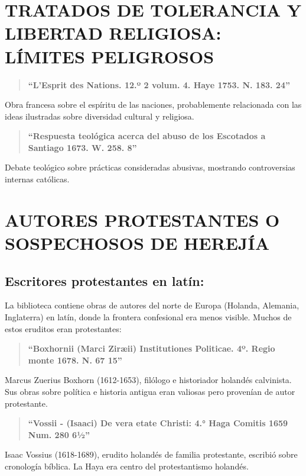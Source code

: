 \documentclass[12pt,a4paper]{article}
\begin{document}
\section{TRATADOS DE TOLERANCIA Y LIBERTAD RELIGIOSA: LÍMITES PELIGROSOS}

\begin{quote}
\textbf{``L'Esprit des Nations. 12.º 2 volum. 4. Haye 1753. N. 183. 24''}
\end{quote}

Obra francesa sobre el espíritu de las naciones, probablemente relacionada con las ideas ilustradas sobre diversidad cultural y religiosa.

\begin{quote}
\textbf{``Respuesta teológica acerca del abuso de los Escotados a Santiago 1673. W. 258. 8''}
\end{quote}

Debate teológico sobre prácticas consideradas abusivas, mostrando controversias internas católicas.

\section{AUTORES PROTESTANTES O SOSPECHOSOS DE HEREJÍA}

\subsection*{Escritores protestantes en latín:}

La biblioteca contiene obras de autores del norte de Europa (Holanda, Alemania, Inglaterra) en latín, donde la frontera confesional era menos visible. Muchos de estos eruditos eran protestantes:

\begin{quote}
\textbf{``Boxhornii (Marci Ziræii) Institutiones Politicae. 4º. Regio monte 1678. N. 67 15''}
\end{quote}

Marcus Zuerius Boxhorn (1612-1653), filólogo e historiador holandés calvinista. Sus obras sobre política e historia antigua eran valiosas pero provenían de autor protestante.

\begin{quote}
\textbf{``Vossii - (Isaaci) De vera etate Christi: 4.° Haga Comitis 1659 Num. 280 6½''}
\end{quote}

Isaac Vossius (1618-1689), erudito holandés de familia protestante, escribió sobre cronología bíblica. La Haya era centro del protestantismo holandés.
\end{document}

